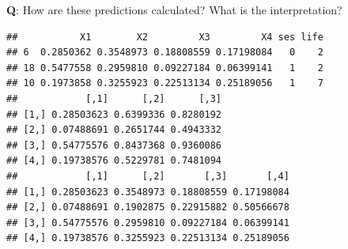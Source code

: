 \documentclass[
  ignorenonframetext,
]{beamer}
\newenvironment{Shaded}{\begin{snugshade}}{\end{snugshade}}
\newcommand{\AttributeTok}[1]{\textcolor[rgb]{0.13,0.29,0.53}{#1}}
\newcommand{\CommentTok}[1]{\textcolor[rgb]{0.56,0.35,0.01}{\textit{#1}}}
\newcommand{\DecValTok}[1]{\textcolor[rgb]{0.00,0.00,0.81}{#1}}
\newcommand{\FunctionTok}[1]{\textcolor[rgb]{0.13,0.29,0.53}{\textbf{#1}}}
\newcommand{\NormalTok}[1]{#1}
\newcommand{\OtherTok}[1]{\textcolor[rgb]{0.56,0.35,0.01}{#1}}
\newcommand{\SpecialCharTok}[1]{\textcolor[rgb]{0.81,0.36,0.00}{\textbf{#1}}}
\begin{document}
\begin{frame}[fragile]
\textbf{Q}: How are these predictions calculated? What is the
interpretation?

\begin{Shaded}
\end{Shaded}

\begin{verbatim}
##           X1        X2         X3         X4 ses life
## 6  0.2850362 0.3548973 0.18808559 0.17198084   0    2
## 18 0.5477558 0.2959810 0.09227184 0.06399141   1    2
## 10 0.1973858 0.3255923 0.22513134 0.25189056   1    7
##            [,1]      [,2]      [,3]
## [1,] 0.28503623 0.6399336 0.8280192
## [2,] 0.07488691 0.2651744 0.4943332
## [3,] 0.54775576 0.8437368 0.9360086
## [4,] 0.19738576 0.5229781 0.7481094
##            [,1]      [,2]       [,3]       [,4]
## [1,] 0.28503623 0.3548973 0.18808559 0.17198084
## [2,] 0.07488691 0.1902875 0.22915882 0.50566678
## [3,] 0.54775576 0.2959810 0.09227184 0.06399141
## [4,] 0.19738576 0.3255923 0.22513134 0.25189056
\end{verbatim}
\end{frame}
\end{document}
